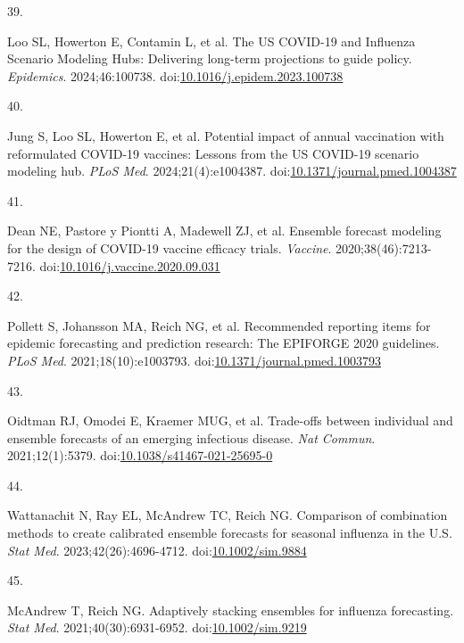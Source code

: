 \documentclass[
]{article}
\newlength{\cslhangindent}
\newlength{\csllabelwidth}
\newenvironment{CSLReferences}[2] %
 {\begin{list}{}{%
  \setlength{\itemindent}{0pt}
  \setlength{\leftmargin}{0pt}
  \setlength{\parsep}{0pt}
  \ifodd #1
   \setlength{\leftmargin}{\cslhangindent}
   \setlength{\itemindent}{-1\cslhangindent}
  \fi
  \setlength{\itemsep}{#2\baselineskip}}}
 {\end{list}}
\newcommand{\CSLLeftMargin}[1]{\parbox[t]{\csllabelwidth}{\strut#1\strut}}
\newcommand{\CSLRightInline}[1]{\parbox[t]{\linewidth - \csllabelwidth}{\strut#1\strut}}
\begin{document}
\begin{CSLReferences}{0}{1}
\CSLLeftMargin{39. }%
\CSLRightInline{Loo SL, Howerton E, Contamin L, et al. The {US}
{COVID}-19 and {Influenza} {Scenario} {Modeling} {Hubs}: {Delivering}
long-term projections to guide policy. \emph{Epidemics}. 2024;46:100738.
doi:\href{https://doi.org/10.1016/j.epidem.2023.100738}{10.1016/j.epidem.2023.100738}}

\CSLLeftMargin{40. }%
\CSLRightInline{Jung S, Loo SL, Howerton E, et al. Potential impact of
annual vaccination with reformulated {COVID}-19 vaccines: {Lessons} from
the {US} {COVID}-19 scenario modeling hub. \emph{PLoS Med}.
2024;21(4):e1004387.
doi:\href{https://doi.org/10.1371/journal.pmed.1004387}{10.1371/journal.pmed.1004387}}

\CSLLeftMargin{41. }%
\CSLRightInline{Dean NE, Pastore y Piontti A, Madewell ZJ, et al.
Ensemble forecast modeling for the design of {COVID}-19 vaccine efficacy
trials. \emph{Vaccine}. 2020;38(46):7213-7216.
doi:\href{https://doi.org/10.1016/j.vaccine.2020.09.031}{10.1016/j.vaccine.2020.09.031}}

\CSLLeftMargin{42. }%
\CSLRightInline{Pollett S, Johansson MA, Reich NG, et al. Recommended
reporting items for epidemic forecasting and prediction research: {The}
{EPIFORGE} 2020 guidelines. \emph{PLoS Med}. 2021;18(10):e1003793.
doi:\href{https://doi.org/10.1371/journal.pmed.1003793}{10.1371/journal.pmed.1003793}}

\CSLLeftMargin{43. }%
\CSLRightInline{Oidtman RJ, Omodei E, Kraemer MUG, et al. Trade-offs
between individual and ensemble forecasts of an emerging infectious
disease. \emph{Nat Commun}. 2021;12(1):5379.
doi:\href{https://doi.org/10.1038/s41467-021-25695-0}{10.1038/s41467-021-25695-0}}

\CSLLeftMargin{44. }%
\CSLRightInline{Wattanachit N, Ray EL, McAndrew TC, Reich NG. Comparison
of combination methods to create calibrated ensemble forecasts for
seasonal influenza in the {U}.{S}. \emph{Stat Med}.
2023;42(26):4696-4712.
doi:\href{https://doi.org/10.1002/sim.9884}{10.1002/sim.9884}}

\CSLLeftMargin{45. }%
\CSLRightInline{McAndrew T, Reich NG. Adaptively stacking ensembles for
influenza forecasting. \emph{Stat Med}. 2021;40(30):6931-6952.
doi:\href{https://doi.org/10.1002/sim.9219}{10.1002/sim.9219}}


\end{CSLReferences}
\end{document}
